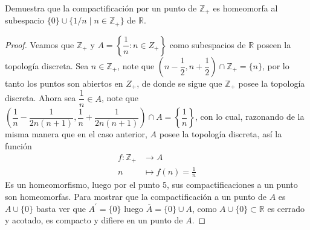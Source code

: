 
 \item Demuestra que la compactificación por un punto de $\mathbb{Z}_{+}$ es homeomorfa al subespacio $\{0\} \cup \{1 / n \mid n \in \mathbb{Z}_{+}\}$ de $\mathbb{R}$.

 \begin{proof}
Veamos que $\mathbb{Z}_{+}$ y $A=\left\{\dfrac{1}{n}: n \in Z_{+}\right\}$ como subespacios de $\mathbb{R}$ poseen la topología discreta. Sea $n \in \mathbb{Z}_{+}$, note que $\left(n-\dfrac{1}{2}, n + \dfrac{1}{2}\right) \cap \mathbb{Z}_{+} = \{n\}$, por lo tanto los puntos son abiertos en ${Z}_{+}$, de donde se sigue que $\mathbb{Z}_{+}$ posee la topología discreta. Ahora sea $\dfrac{1}{n} \in A$, note que $\left(\dfrac{1}{n}-\dfrac{1}{2n(n+1)},\dfrac{1}{n}+\dfrac{1}{2n(n+1)}\right)\cap A = \left\{\dfrac{1}{n}\right\}$, con lo cual, razonando de la misma manera que en el caso anterior, $A$ posee la topología discreta, así la función
\begin{align*}
    f : \mathbb{Z}_{+}&\longrightarrow A \\
    n &\longmapsto f(n) = \frac{1}{n}
\end{align*} 
Es un homeomorfismo, luego por el punto 5, sus compactificaciones a un punto son homeomorfas. Para mostrar que la compactificación a un punto de $A$ es $A \cup \{0\}$  basta ver que $A^{\prime}=\{0\}$ luego $\overline{A}=\{0\} \cup A$, como $A \cup \{0\} \subset \mathbb{R}$ es cerrado y acotado, es compacto y difiere en un punto de $A$.  
 \end{proof}